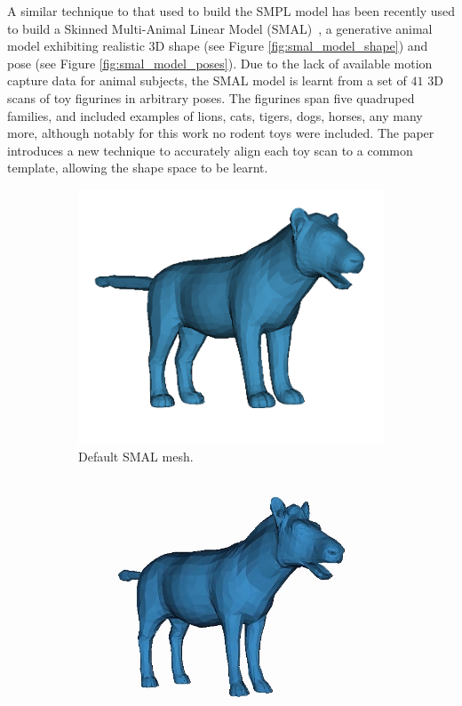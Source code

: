A similar technique to that used to build the SMPL model has been recently used to build a Skinned Multi-Animal Linear Model (SMAL)~\cite{zuffi2017menagerie}, a generative animal model exhibiting realistic 3D shape (see Figure \ref{fig:smal_model_shape}) and pose (see Figure \ref{fig:smal_model_poses}). Due to the lack of available motion capture data for animal subjects, the SMAL model is learnt from a set of $41$ 3D scans of toy figurines in arbitrary poses. The figurines span five quadruped families, and included examples of lions, cats, tigers, dogs, horses, any many more, although notably for this work no rodent toys were included. The paper introduces a new technique to accurately align each toy scan to a common template, allowing the shape space to be learnt.

\begin{figure}[H]
    \centering
    \begin{subfigure}{0.3\linewidth}
    \centering
        \includegraphics[width=1\linewidth]{smal/default}
        \caption{Default SMAL mesh.}
    \end{subfigure}%
    \begin{subfigure}{0.3\linewidth}
    \centering
        \includegraphics[width=1\linewidth]{smal/horse}

\end{subfigure}
\end{figure}
